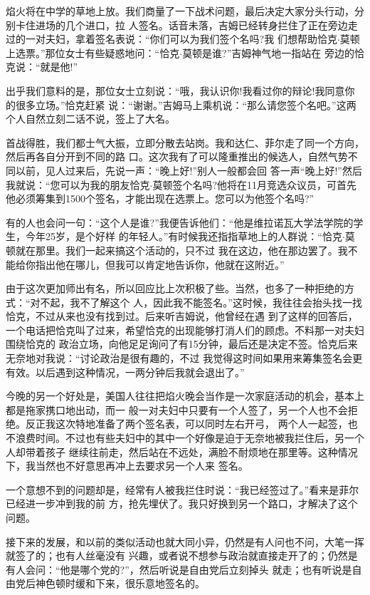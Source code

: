 ﻿\documentclass[11pt]{article}
\begin{document}
焰火将在中学的草地上放。我们商量了一下战术问题，最后决定大家分头行动，分别卡住进场的几个进口，拉
人签名。话音未落，吉姆已经转身拦住了正在旁边走过的一对夫妇，拿着签名表说：``你们可以为我们签个名吗?我
们想帮助恰克$\cdot$莫顿上选票。''那位女士有些疑惑地问：``恰克$\cdot$莫顿是谁?''吉姆神气地一指站在
旁边的恰克说：``就是他!''

出乎我们意料的是，那位女士立刻说：``哦，我认识你!我看过你的辩论!我同意你的很多立场。''恰克赶紧
说：``谢谢。''吉姆马上乘机说：``那么请您签个名吧。''这两个人自然立刻二话不说，签上了大名。

首战得胜，我们都士气大振，立即分散去站岗。我和达仁、菲尔走了同一个方向，然后再各自分开到不同的路
口。这次我有了可以隆重推出的候选人，自然气势不同以前，见人过来后，先说一声：``晚上好!''别人一般都会回
答一声``晚上好!''然后我就说：``您可以为我的朋友恰克$\cdot$莫顿签个名吗?他将在11月竞选众议员，可首先
他必须筹集到1500个签名，才能出现在选票上。您可以为他签个名吗?''

有的人也会问一句：``这个人是谁?''我便告诉他们：``他是维拉诺瓦大学法学院的学生，今年25岁，是个好样
的年轻人。''有时候我还指指草地上的人群说：``恰克$\cdot$莫顿就在那里。我们一起来搞这个活动的，只不过
我在这边，他在那边罢了。我不能给你指出他在哪儿，但我可以肯定地告诉你，他就在这附近。''

由于这次更加师出有名，所以回应比上次积极了些。当然，也多了一种拒绝的方式：``对不起，我不了解这个
人，因此我不能签名。''这时候，我往往会抬头找一找恰克，不过从来也没有找到过。后来听吉姆说，他曾经在遇
到了这样的回答后，一个电话把恰克叫了过来，希望恰克的出现能够打消人们的顾虑。不料那一对夫妇围绕恰克的
政治立场，向他足足询问了有15分钟，最后还是决定不签。恰克后来无奈地对我说：``讨论政治是很有趣的，不过
我觉得这时间如果用来筹集签名会更有效。以后遇到这种情况，一两分钟后我就会退出了。''

今晚的另一个好处是，美国人往往把焰火晚会当作是一次家庭活动的机会，基本上都是拖家携口地出动，而一
般一对夫妇中只要有一个人签了，另一个人也不会拒绝。反正我这次特地准备了两个签名表，可以同时左右开弓，
两个人一起签，也不浪费时间。不过也有些夫妇中的其中一个好像是迫于无奈地被我拦住后，另一个人却带着孩子
继续往前走，然后站在不远处，满脸不耐烦地在那里等。这种情况下，我当然也不好意思再冲上去要求另一个人来
签名。

一个意想不到的问题却是，经常有人被我拦住时说：``我已经签过了。''看来是菲尔已经进一步冲到我的前
方，抢先埋伏了。我只好换到另一个路口，才解决了这个问题。

接下来的发展，和以前的类似活动也就大同小异，仍然是有人问也不问，大笔一挥就签了的；也有人丝毫没有
兴趣，或者说不想参与政治就直接走开了的；仍然是有人会问：``他是哪个党的?''，然后听说是自由党后立刻掉头
就走；也有听说是自由党后神色顿时缓和下来，很乐意地签名的。
\end{document}
